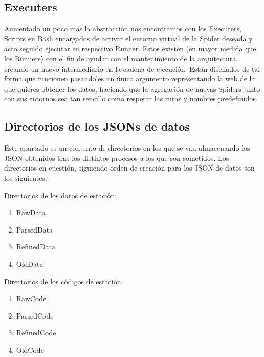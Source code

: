 \subsection{Executers}
Aumentado un poco mas la abstracción nos encontramos con los Executers, Scripts en Bash encargados de activar el entorno virtual de la Spider deseada y acto seguido ejecutar su respectivo Runner.\newline
\newline
Estos existen (en mayor medida que los Runners) con el fin de ayudar con el mantenimiento de la arquitectura, creando un nuevo intermediario en la cadena de ejecución.\newline
\newline
Están diseñados de tal forma que funcionen pasandoles un único argumento representando la web de la que quieres obtener los datos, haciendo que la agregación de nuevas Spiders junto con sus entornos sea tan sencillo como respetar las rutas y nombres predefinidos.

\subsection{Directorios de los JSONs de datos}
Este apartado es un conjunto de directorios en los que se van almacenando los JSON obtenidos tras los distintos procesos a los que son sometidos.\newline
\newline
Los directorios en cuestión, siguiendo orden de creación para los JSON de datos son los siguientes:

\begin{multicols}{2}
Directorios de los datos de estación:
\begin{enumerate}
	\item RawData
	\item ParsedData
	\item RefinedData
	\item OldData
\end{enumerate}

\columnbreak

Directorios de los códigos de estación:
\begin{enumerate}
	\item RawCode
	\item ParsedCode
	\item RefinedCode
	\item OldCode
\end{enumerate}
\end{multicols}

